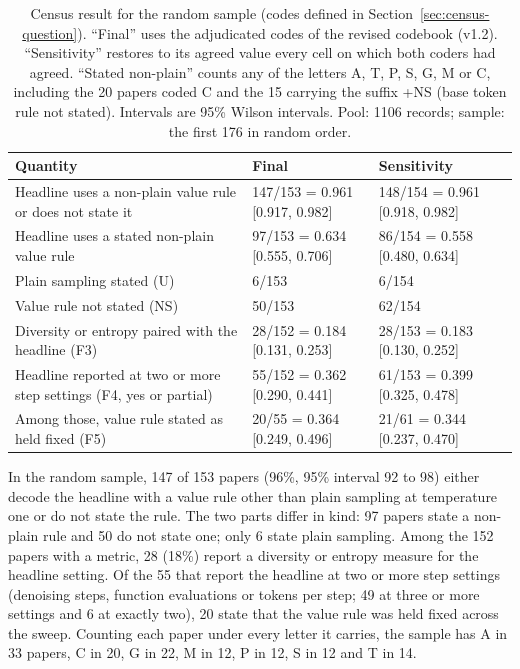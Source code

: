 \begin{table}[t]
\caption{Census result for the random sample (codes defined in Section~\ref{sec:census-question}). ``Final'' uses the adjudicated codes of the revised codebook (v1.2). ``Sensitivity'' restores to its agreed value every cell on which both coders had agreed. ``Stated non-plain'' counts any of the letters A, T, P, S, G, M or C, including the 20 papers coded C and the 15 carrying the suffix +NS (base token rule not stated). Intervals are 95\% Wilson intervals. Pool: 1106 records; sample: the first 176 in random order.}
\label{tab:census-main}
\small
\begin{tabular}{@{}p{5.2cm}p{3.7cm}p{3.7cm}@{}}
\toprule
Quantity & Final & Sensitivity \\
\midrule
Headline uses a non-plain value rule or does not state it & 147/153 = 0.961 [0.917, 0.982] & 148/154 = 0.961 [0.918, 0.982] \\ %
Headline uses a stated non-plain value rule & 97/153 = 0.634 [0.555, 0.706] & 86/154 = 0.558 [0.480, 0.634] \\
Plain sampling stated (U) & 6/153 & 6/154 \\
Value rule not stated (NS) & 50/153 & 62/154 \\
Diversity or entropy paired with the headline (F3) & 28/152 = 0.184 [0.131, 0.253] & 28/153 = 0.183 [0.130, 0.252] \\
Headline reported at two or more step settings (F4, yes or partial) & 55/152 = 0.362 [0.290, 0.441] & 61/153 = 0.399 [0.325, 0.478] \\
Among those, value rule stated as held fixed (F5) & 20/55 = 0.364 [0.249, 0.496] & 21/61 = 0.344 [0.237, 0.470] \\
\bottomrule
\end{tabular}
\end{table}

In the random sample, 147 of 153 papers (96\%, 95\% interval 92 to 98) either decode the headline with a value rule other than plain sampling at temperature one or do not state the rule. The two parts differ in kind: 97 papers state a non-plain rule and 50 do not state one; only 6 state plain sampling. %
Among the 152 papers with a metric, 28 (18\%) report a diversity or entropy measure for the headline setting. Of the 55 that report the headline at two or more step settings (denoising steps, function evaluations or tokens per step; 49 at three or more settings and 6 at exactly two), 20 state that the value rule was held fixed across the sweep.%
Counting each paper under every letter it carries, the sample has A in 33 papers, C in 20, G in 22, M in 12, P in 12, S in 12 and T in 14.%



